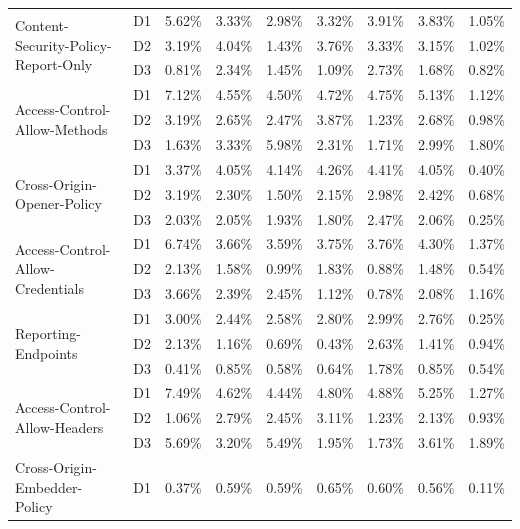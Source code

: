 \begin{table}[!ht]
\begin{tabular}{l|c|c|c|c|c|c|c|c}
        \multirow{3}{*}{Content-Security-Policy-Report-Only} & D1 & 5.62\% & 3.33\% & 2.98\% & 3.32\% & 3.91\% & 3.83\% & 1.05\% \\
        ~ & D2 & 3.19\% & 4.04\% & 1.43\% & 3.76\% & 3.33\% & 3.15\% & 1.02\% \\
        ~ & D3 & 0.81\% & 2.34\% & 1.45\% & 1.09\% & 2.73\% & 1.68\% & 0.82\% \\ \hline
        \multirow{3}{*}{Access-Control-Allow-Methods} & D1 & 7.12\% & 4.55\% & 4.50\% & 4.72\% & 4.75\% & 5.13\% & 1.12\% \\
        ~ & D2 & 3.19\% & 2.65\% & 2.47\% & 3.87\% & 1.23\% & 2.68\% & 0.98\% \\
        ~ & D3 & 1.63\% & 3.33\% & 5.98\% & 2.31\% & 1.71\% & 2.99\% & 1.80\% \\ \hline
        \multirow{3}{*}{Cross-Origin-Opener-Policy} & D1 & 3.37\% & 4.05\% & 4.14\% & 4.26\% & 4.41\% & 4.05\% & 0.40\% \\
        ~ & D2 & 3.19\% & 2.30\% & 1.50\% & 2.15\% & 2.98\% & 2.42\% & 0.68\% \\
        ~ & D3 & 2.03\% & 2.05\% & 1.93\% & 1.80\% & 2.47\% & 2.06\% & 0.25\% \\ \hline
        \multirow{3}{*}{Access-Control-Allow-Credentials} & D1 & 6.74\% & 3.66\% & 3.59\% & 3.75\% & 3.76\% & 4.30\% & 1.37\% \\
        ~ & D2 & 2.13\% & 1.58\% & 0.99\% & 1.83\% & 0.88\% & 1.48\% & 0.54\% \\
        ~ & D3 & 3.66\% & 2.39\% & 2.45\% & 1.12\% & 0.78\% & 2.08\% & 1.16\% \\ \hline
        \multirow{3}{*}{Reporting-Endpoints} & D1 & 3.00\% & 2.44\% & 2.58\% & 2.80\% & 2.99\% & 2.76\% & 0.25\% \\
        ~ & D2 & 2.13\% & 1.16\% & 0.69\% & 0.43\% & 2.63\% & 1.41\% & 0.94\% \\
        ~ & D3 & 0.41\% & 0.85\% & 0.58\% & 0.64\% & 1.78\% & 0.85\% & 0.54\% \\ \hline
        \multirow{3}{*}{Access-Control-Allow-Headers} & D1 & 7.49\% & 4.62\% & 4.44\% & 4.80\% & 4.88\% & 5.25\% & 1.27\% \\
        ~ & D2 & 1.06\% & 2.79\% & 2.45\% & 3.11\% & 1.23\% & 2.13\% & 0.93\% \\
        ~ & D3 & 5.69\% & 3.20\% & 5.49\% & 1.95\% & 1.73\% & 3.61\% & 1.89\% \\ \hline
        \multirow{3}{*}{Cross-Origin-Embedder-Policy} & D1 & 0.37\% & 0.59\% & 0.59\% & 0.65\% & 0.60\% & 0.56\% & 0.11\% \\

\end{tabular}
\end{table}
